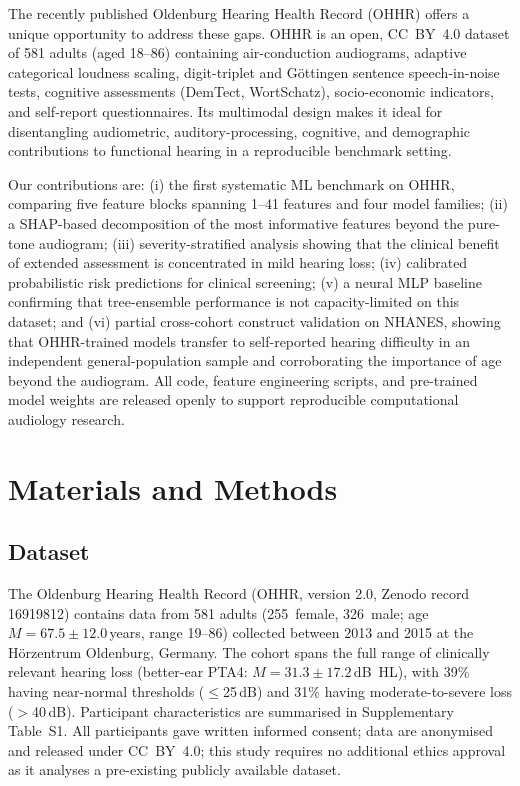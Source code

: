 \documentclass[12pt,a4paper]{article}
\begin{document}
The recently published Oldenburg Hearing Health Record
(OHHR)\cite{OHHR2025} offers a unique opportunity to address these gaps.
OHHR is an open, CC~BY~4.0 dataset of 581 adults (aged 18--86) containing
air-conduction audiograms, adaptive categorical loudness scaling, digit-triplet
and G\"{o}ttingen sentence speech-in-noise tests, cognitive assessments
(DemTect, WortSchatz), socio-economic indicators, and self-report
questionnaires.  Its multimodal design makes it ideal for disentangling
audiometric, auditory-processing, cognitive, and demographic contributions
to functional hearing in a reproducible benchmark setting.

Our contributions are: (i) the first systematic ML benchmark on OHHR,
comparing five feature blocks spanning 1--41 features and four model
families; (ii) a SHAP-based decomposition of the most informative features
beyond the pure-tone audiogram; (iii) severity-stratified analysis showing
that the clinical benefit of extended assessment is concentrated in mild
hearing loss; (iv) calibrated probabilistic risk predictions for clinical
screening; (v) a neural MLP baseline confirming that tree-ensemble
performance is not capacity-limited on this dataset; and (vi) partial cross-cohort construct validation on NHANES, showing that
OHHR-trained models transfer to self-reported hearing difficulty in an
independent general-population sample and corroborating the importance of
age beyond the audiogram.
All code, feature engineering scripts, and pre-trained model weights are
released openly to support reproducible computational audiology research.

\section{Materials and Methods}

\subsection{Dataset}

The Oldenburg Hearing Health Record (OHHR, version 2.0, Zenodo record
16919812\cite{OHHR2025}) contains data from 581 adults (255~female,
326~male; age $M=67.5\pm12.0$\,years, range 19--86) collected between 2013
and 2015 at the H\"{o}rzentrum Oldenburg, Germany.  The cohort spans the
full range of clinically relevant hearing loss (better-ear PTA4:
$M=31.3\pm17.2$\,dB~HL), with 39\% having near-normal thresholds
($\leq$25\,dB) and 31\% having moderate-to-severe loss ($>$40\,dB).
Participant characteristics are summarised in Supplementary Table~S1.
All participants gave written informed consent; data are anonymised and
released under CC~BY~4.0; this study requires no additional ethics approval
as it analyses a pre-existing publicly available dataset.
\end{document}

